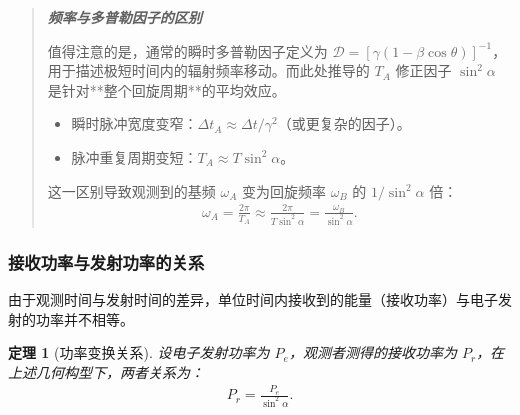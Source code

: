\documentclass[12pt,oneside]{ctexart}
\theoremstyle{definition}
\theoremstyle{plain}
\newtheorem{theorem}[definition]{定理}
\theoremstyle{remark}
\newif\ifshowderiv
\newcommand{\derivdefaulttitle}{额外说明}
\newenvironment{derivationnote}[1][\derivdefaulttitle]{%
  \ifshowderiv\begin{quote}\small\itshape
  \noindent\textbf{#1}\;\par
}{%
  \end{quote}\fi
}
\begin{document}
\begin{derivationnote}[频率与多普勒因子的区别]
值得注意的是，通常的瞬时多普勒因子定义为 $\mathcal{D} = [\gamma(1 - \beta \cos\theta)]^{-1}$，用于描述极短时间内的辐射频率移动。而此处推导的 $T_A$ 修正因子 $\sin^2\alpha$ 是针对**整个回旋周期**的平均效应。
\begin{itemize}
    \item 瞬时脉冲宽度变窄：$\Delta t_{A} \approx \Delta t / \gamma^2$（或更复杂的因子）。
    \item 脉冲重复周期变短：$T_{A} \approx T \sin^2\alpha$。
\end{itemize}
这一区别导致观测到的基频 $\omega_{A}$ 变为回旋频率 $\omega_{B}$ 的 $1/\sin^2\alpha$ 倍：
\begin{align}
    \omega_{A} = \frac{2\pi}{T_{A}} \approx \frac{2\pi}{T \sin^2\alpha} = \frac{\omega_{B}}{\sin^2\alpha}.
\end{align}
\end{derivationnote}

\subsubsection{接收功率与发射功率的关系}

由于观测时间与发射时间的差异，单位时间内接收到的能量（接收功率）与电子发射的功率并不相等。

\begin{theorem}[功率变换关系]
\label{thm:power_relation}
设电子发射功率为 $P_{e}$，观测者测得的接收功率为 $P_{r}$，在上述几何构型下，两者关系为：
\begin{align}
    P_{r} = \frac{P_{e}}{\sin^2\alpha}.
    \label{eq:power_relation}
\end{align}
\end{theorem}
\end{document}
